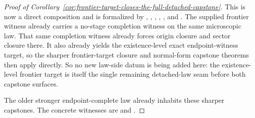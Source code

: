 \begin{proof}[Proof of Corollary~\ref{cor:frontier-target-closes-the-full-detached-capstone}]
\label{proof:cor:frontier-target-closes-the-full-detached-capstone}
This is now a direct composition and is formalized by
,
,
,
,
,
and
.
The supplied frontier witness already carries a no-stage completion witness on
the same microscopic law. That same completion witness already forces origin
closure and sector closure there. It also already yields the existence-level
exact endpoint-witness target, so the sharper frontier-target closure and
normal-form capstone theorems then apply directly. So no new law-side datum is
being added here: the existence-level frontier target is itself the single
remaining detached-law seam before both capstone surfaces.

The older stronger endpoint-complete law already inhabits these sharper
capstones. The concrete witnesses are
and
.
\end{proof}

